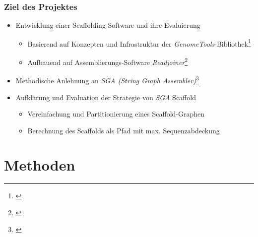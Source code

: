 \documentclass[xcolor=pst]{beamer}
\begin{document}
\begin{frame}
  \frametitle{Ziel des Projektes}
  \begin{itemize}
  \item Entwicklung einer Scaffolding-Software und ihre Evaluierung
  \begin{itemize}
    \item Basierend auf Konzepten und Infrastruktur der \textit{GenomeTools}-Bibliothek\footnote{\cite{Gremme:2013}}
    \item Aufbauend auf Assemblierungs-Software \textit{Readjoiner}\footnote{\cite{Gonnella:2012gn}}
  \end{itemize}
  \item Methodische Anlehnung an \textit{SGA (String Graph Assembler)}\footnote{\cite{Simpson:2012ef}}
  \item Aufklärung und Evaluation der Strategie von \textit{SGA} Scaffold
  \begin{itemize}
    \item Vereinfachung und Partitionierung eines Scaffold-Graphen
    \item Berechnung des Scaffolds als Pfad mit max. Sequenzabdeckung
  \end{itemize}
  \end{itemize}
\end{frame}

\section{Methoden}

\end{document}
